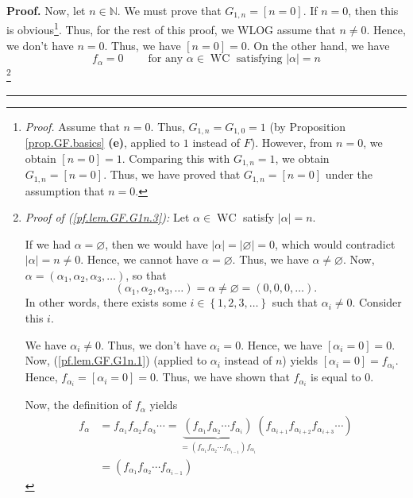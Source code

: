 \documentclass[numbers=enddot,12pt,final,onecolumn,notitlepage]{scrartcl}%
\theoremstyle{definition}
\newenvironment{proof}[1][Proof]{\noindent\textbf{#1.} }{\ \rule{0.5em}{0.5em}}
\newenvironment{verlong}{}{}
\begin{document}
\begin{verlong}
\begin{proof}
Now, let $n\in\mathbb{N}$. We must prove that $G_{1,n}=\left[  n=0\right]  $.
If $n=0$, then this is obvious\footnote{\textit{Proof.} Assume that $n=0$.
Thus, $G_{1,n}=G_{1,0}=1$ (by Proposition \ref{prop.GF.basics} \textbf{(e)},
applied to $1$ instead of $F$). However, from $n=0$, we obtain $\left[
n=0\right]  =1$. Comparing this with $G_{1,n}=1$, we obtain $G_{1,n}=\left[
n=0\right]  $. Thus, we have proved that $G_{1,n}=\left[  n=0\right]  $ under
the assumption that $n=0$.}. Thus, for the rest of this proof, we WLOG assume
that $n\neq0$. Hence, we don't have $n=0$. Thus, we have $\left[  n=0\right]
=0$. On the other hand, we have
\begin{equation}
f_{\alpha}=0\ \ \ \ \ \ \ \ \ \ \text{for any }\alpha\in\operatorname*{WC}%
\text{ satisfying }\left\vert \alpha\right\vert =n \label{pf.lem.GF.G1n.3}%
\end{equation}
\footnote{\textit{Proof of (\ref{pf.lem.GF.G1n.3}):} Let $\alpha
\in\operatorname*{WC}$ satisfy $\left\vert \alpha\right\vert =n$.
\par
If we had $\alpha=\varnothing$, then we would have $\left\vert \alpha
\right\vert =\left\vert \varnothing\right\vert =0$, which would contradict
$\left\vert \alpha\right\vert =n\neq0$. Hence, we cannot have $\alpha
=\varnothing$. Thus, we have $\alpha\neq\varnothing$. Now, $\alpha=\left(
\alpha_{1},\alpha_{2},\alpha_{3},\ldots\right)  $, so that%
\[
\left(  \alpha_{1},\alpha_{2},\alpha_{3},\ldots\right)  =\alpha\neq
\varnothing=\left(  0,0,0,\ldots\right)  .
\]
In other words, there exists some $i\in\left\{  1,2,3,\ldots\right\}  $ such
that $\alpha_{i}\neq0$. Consider this $i$.
\par
We have $\alpha_{i}\neq0$. Thus, we don't have $\alpha_{i}=0$. Hence, we have
$\left[  \alpha_{i}=0\right]  =0$. Now, (\ref{pf.lem.GF.G1n.1}) (applied to
$\alpha_{i}$ instead of $n$) yields $\left[  \alpha_{i}=0\right]
=f_{\alpha_{i}}$. Hence, $f_{\alpha_{i}}=\left[  \alpha_{i}=0\right]  =0$.
Thus, we have shown that $f_{\alpha_{i}}$ is equal to $0$.
\par
Now, the definition of $f_{\alpha}$ yields
\begin{align*}
f_{\alpha}  &  =f_{\alpha_{1}}f_{\alpha_{2}}f_{\alpha_{3}}\cdots
=\underbrace{\left(  f_{\alpha_{1}}f_{\alpha_{2}}\cdots f_{\alpha_{i}}\right)
}_{=\left(  f_{\alpha_{1}}f_{\alpha_{2}}\cdots f_{\alpha_{i-1}}\right)
f_{\alpha_{i}}}\left(  f_{\alpha_{i+1}}f_{\alpha_{i+2}}f_{\alpha_{i+3}}%
\cdots\right) \\
&  =\left(  f_{\alpha_{1}}f_{\alpha_{2}}\cdots f_{\alpha_{i-1}}\right)

\end{align*}}
\end{proof}
\end{verlong}
\end{document}
